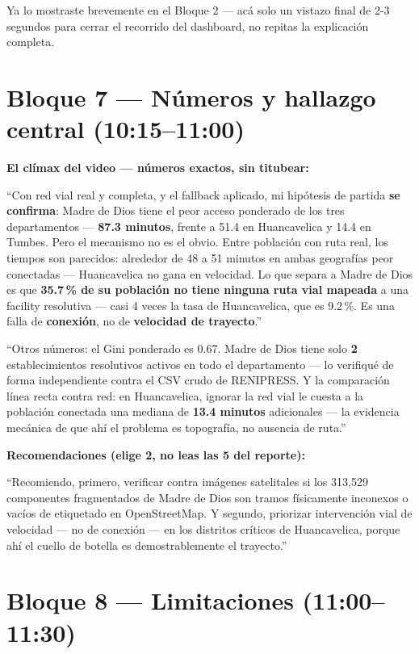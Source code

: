 \documentclass[11pt]{article}
\begin{document}
\begin{hacerbox}
Ya lo mostraste brevemente en el Bloque 2 --- acá solo un vistazo final
de 2-3 segundos para cerrar el recorrido del dashboard, no repitas la
explicación completa.
\end{hacerbox}

\clearpage
\section{Bloque 7 --- Números y hallazgo central (10:15--11:00)}

\begin{decirbox}
\textbf{El clímax del video --- números exactos, sin titubear:}

``Con red vial real y completa, y el fallback aplicado, mi hipótesis de
partida \textbf{se confirma}: Madre de Dios tiene el peor acceso
ponderado de los tres departamentos --- \textbf{87.3 minutos}, frente a
51.4 en Huancavelica y 14.4 en Tumbes. Pero el mecanismo no es el obvio.
Entre población con ruta real, los tiempos son parecidos: alrededor de
48 a 51 minutos en ambas geografías peor conectadas --- Huancavelica no
gana en velocidad. Lo que separa a Madre de Dios es que \textbf{35.7\,\%
de su población no tiene ninguna ruta vial mapeada} a una facility
resolutiva --- casi 4 veces la tasa de Huancavelica, que es 9.2\,\%. Es
una falla de \textbf{conexión}, no de \textbf{velocidad de trayecto}.''

``Otros números: el Gini ponderado es 0.67. Madre de Dios tiene solo
\textbf{2} establecimientos resolutivos activos en todo el
departamento --- lo verifiqué de forma independiente contra el CSV
crudo de RENIPRESS. Y la comparación línea recta contra red: en
Huancavelica, ignorar la red vial le cuesta a la población conectada una
mediana de \textbf{13.4 minutos} adicionales --- la evidencia mecánica de
que ahí el problema es topografía, no ausencia de ruta.''

\textbf{Recomendaciones (elige 2, no leas las 5 del reporte):}

``Recomiendo, primero, verificar contra imágenes satelitales si los
313,529 componentes fragmentados de Madre de Dios son tramos físicamente
inconexos o vacíos de etiquetado en OpenStreetMap. Y segundo, priorizar
intervención vial de velocidad --- no de conexión --- en los distritos
críticos de Huancavelica, porque ahí el cuello de botella es
demostrablemente el trayecto.''
\end{decirbox}

\section{Bloque 8 --- Limitaciones (11:00--11:30)}
\end{document}
